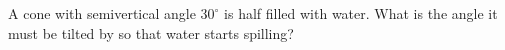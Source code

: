 A cone with semivertical angle $30^{\circ}$ is half filled with water. What is the angle it must be tilted by so that water starts spilling?